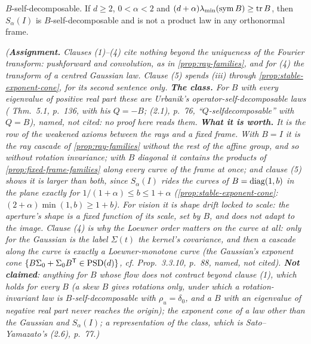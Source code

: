 \begin{proposition}
\begin{enumerate}
$B$-self-decomposable. If $d \ge 2$, $0 < \alpha < 2$ and
$(d+\alpha)\lambda_{\min}(\mathrm{sym}\,B) \ge \operatorname{tr} B$, then $S_\alpha(I)$ is $B$-self-decomposable
and is not a product law in any orthonormal frame.
\end{enumerate}
\statusA\quad{}\quad\emph{(\textbf{Assignment.} Clauses (1)--(4) cite nothing beyond the
uniqueness of the Fourier transform: pushforward and convolution, as in \ref{prop:ray-families}, and
for (4) the transform of a centred Gaussian law. Clause (5) spends (iii) through
\ref{prop:stable-exponent-cone}, for its second sentence only. \textbf{The class.} For $B$ with
every eigenvalue of positive real part these are Urbanik's operator-self-decomposable laws
( Thm.~5.1, p.~136, with his $Q = -B$;  (2.1),
p.~76, ``$Q$-selfdecomposable'' with $Q = B$), named, not cited: no proof here reads them.
\textbf{What it is worth.} It is the row of the weakened axioms between the rays and a fixed frame.
With $B = I$ it is the ray cascade of \ref{prop:ray-families} without the rest of the affine group,
and so without rotation invariance; with $B$ diagonal it contains the products of
\ref{prop:fixed-frame-families} along every curve of the frame at once; and clause (5) shows it is
larger than both, since $S_\alpha(I)$ rides the curves of $B = \operatorname{diag}(1, b)$ in the plane exactly for
$1/(1+\alpha) \le b \le 1 + \alpha$ (\ref{prop:stable-exponent-cone}: $(2+\alpha)\min(1, b) \ge 1 + b$). For vision it is shape drift locked to scale: the aperture's shape is a fixed function
of its scale, set by $B$, and does not adapt to the image. Clause (4) is why the Loewner order
matters on the curve at all: only for the Gaussian is the label $\Sigma(t)$ the kernel's covariance,
and then a cascade along the curve is exactly a Loewner-monotone curve (the Gaussian's exponent cone
$\{B\Sigma_0 + \Sigma_0B^{\mathsf{T}} \in \mathrm{PSD}(d)\}$, cf.  Prop.~3.3.10, p.~88,
named, not cited). \textbf{Not claimed}: anything for $B$ whose flow does not contract beyond
clause (1), which holds for every $B$ (a skew $B$ gives rotations only, under which a
rotation-invariant law is $B$-self-decomposable with $\rho_u = \delta_0$, and a $B$ with an
eigenvalue of negative real part never reaches the origin); the exponent cone of a law other than
the Gaussian and $S_\alpha(I)$; a representation of the class, which is Sato--Yamazato's (2.6),
p.~77.)}
\end{proposition}

